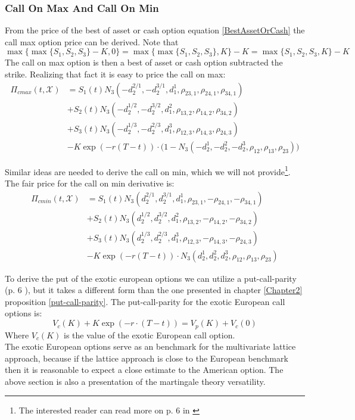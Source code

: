 \subsubsection{Call On Max And Call On Min}
From the price of the best of asset or cash option equation \eqref{BestAssetOrCash} the call max option price can be derived. Note that
$$\max\{\max\{ S_1,S_2,S_3 \} - K, 0\}=\max\{\max\{ S_1,S_2,S_3 \}, K\} - K = \max\{ S_1,S_2,S_3,K \} - K$$
The call on max option is then a best of asset or cash option subtracted the strike. Realizing that fact it is easy to price the call on max:
\begin{equation}\label{callMax}
\begin{split}
\Pi_{cmax}(t,\mathcal{X})&=S_1(t) N_3(-d_2^{2/1},-d_2^{3/1},d_1^{1}, \rho_{23,1}, \rho_{24,1}, \rho_{34,1}) \\
&+S_2(t) N_3(-d_2^{1/2},-d_2^{3/2},d_1^{2}, \rho_{13,2}, \rho_{14,2}, \rho_{34,2})\\
&+S_3(t) N_3(-d_2^{1/3},-d_2^{2/3},d_1^{3}, \rho_{12,3}, \rho_{14,3}, \rho_{24,3}) \\
&-K \exp(-r(T-t)) \cdot\bigg(1 - N_3(-d_2^1,-d_2^2,-d_2^3, \rho_{12}, \rho_{13}, \rho_{23})\bigg)
\end{split}
\end{equation}

Similar ideas are needed to derive the call on min, which we will not provide\footnote{The interested reader can read more on p. 6 in \parencite{Ouwehand2006}}. The fair price for the call on min derivative is:
\begin{equation*}\label{callMin}
\begin{split}
\Pi_{cmin}(t,\mathcal{X})&=S_1(t) N_3(d_2^{2/1},d_2^{3/1},d_1^{1}, \rho_{23,1}, -\rho_{24,1}, -\rho_{34,1}) \\
&+S_2(t) N_3(d_2^{1/2},d_2^{3/2},d_1^{2}, \rho_{13,2}, -\rho_{14,2}, -\rho_{34,2})\\
&+S_3(t) N_3(d_2^{1/3},d_2^{2/3},d_1^{3}, \rho_{12,3}, -\rho_{14,3}, -\rho_{24,3}) \\
&-K \exp(-r(T-t)) \cdot N_3(d_2^1,d_2^2,d_2^3, \rho_{12}, \rho_{13}, \rho_{23})
\end{split}
\end{equation*}

To derive the put of the exotic european options we can utilize a put-call-parity (p. 6 \parencite{Ouwehand2006}), but it takes a different form than the one presented in chapter \ref{Chapter2} proposition \ref{put-call-parity}. The put-call-parity for the exotic European call options is:
\begin{equation*}\label{putMin}
V_c(K)+K\exp(-r\cdot (T-t)) = V_p(K)+V_c(0)
\end{equation*}
Where $V_c(K)$ is the value of the exotic European call option.\\

The exotic European options serve as an benchmark for the multivariate lattice approach, because if the lattice approach is close to the European benchmark then it is reasonable to expect a close estimate to the American option. The above section is also a presentation of the martingale theory versatility. 



